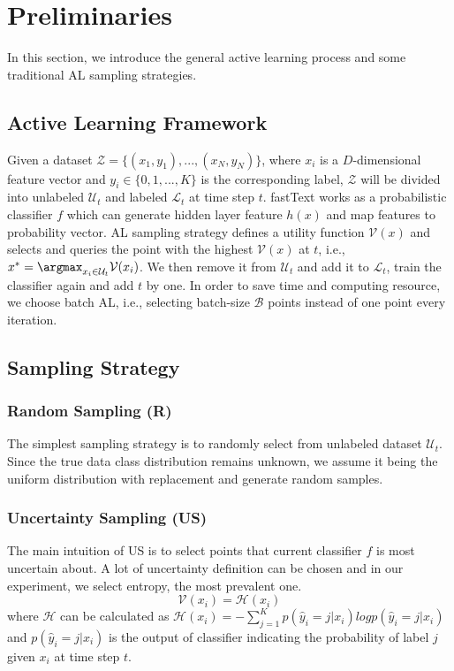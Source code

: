 \section{Preliminaries}
\label{sec:preliminary}
In this section, we introduce the general active learning process and 
some traditional AL sampling strategies. 


\subsection{Active Learning Framework}
Given a dataset $ \mathcal{Z} =  \{(x_1,y_1),...,(x_N,y_N)\}$, where $x_i$ is 
a $D$-dimensional feature vector and $y_i \in \{0,1,...,K\}$ is the corresponding label, 
$\mathcal{Z}$ will be divided into unlabeled $\mathcal{U}_t$ and 
labeled $\mathcal{L}_t$ at time step $t$. 
fastText works as a probabilistic classifier $f$ which can generate hidden layer feature 
$h(x)$ and map features to probability vector. AL sampling strategy defines a utility function $\mathcal{V}(x)$ and selects and queries 
the point with the highest $\mathcal{V}(x)$ at $t$, i.e., $x^*=\argmax_{x_i\in\mathcal{U}_t}\mathcal{V}(x_i)$.
We then remove it from $\mathcal{U}_t$ and 
add it to $\mathcal{L}_t$, train the classifier again and add $t$ by one. In order to save time and computing resource, we choose batch AL, i.e., selecting batch-size $\mathcal{B}$ points 
instead of one point every iteration.


\subsection{Sampling Strategy}
\subsubsection{Random Sampling (R)}
The simplest sampling strategy is to randomly select from unlabeled dataset 
$\mathcal{U}_t$. Since the true data class distribution remains unknown, 
we assume it being the uniform distribution with replacement and generate random samples.

\subsubsection{Uncertainty Sampling (US)}
\label{sec:uncertainty}
The main intuition of US is to select points that current classifier $f$ 
is most uncertain about. A lot of uncertainty definition can be chosen and 
in our experiment, we select entropy, the most prevalent one.
    $$\mathcal{V}(x_i) =  \mathcal{H}(x_i)$$
    where $\mathcal{H}$ can be calculated as $ \mathcal{H}(x_i) = -\sum_{j=1}^K p(\hat{y}_i=j|x_i) log  p(\hat{y}_i=j|x_i)$ and $p(\hat{y}_i=j|x_i)$ is the output of classifier indicating the probability of label $j$ given $x_i$ at time step $t$.
    
